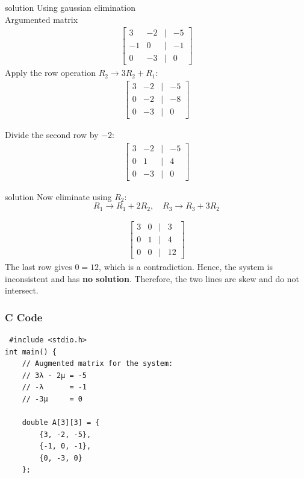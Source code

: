 \documentclass{beamer}
\begin{document}
\begin{frame}{solution}
  Using gaussian elimination\\
 Argumented matrix\\
 \begin{align}
     \begin{bmatrix}
         3 & -2 &  | & -5 \\
         -1 & 0  & | & -1\\
         0 & -3 & | & 0 
     \end{bmatrix}
 \end{align}
 Apply the row operation \( R_2 \to 3R_2 + R_1 \):
\begin{align}
\begin{bmatrix}
3 & -2 & | & -5\\
0 & -2 & | & -8\\
0 & -3 & | & 0
\end{bmatrix}
\end{align}

Divide the second row by \(-2\):
\begin{align}
\begin{bmatrix}
3 & -2 & | & -5\\
0 & 1  & | & 4\\
0 & -3 & | & 0
\end{bmatrix}
\end{align}

\end{frame}
\begin{frame}{solution}
 Now eliminate using \(R_2\):  
\[
R_1 \to R_1 + 2R_2, 
\quad R_3 \to R_3 + 3R_2
\]

\begin{align}
\begin{bmatrix}
3 & 0 & | & 3\\
0 & 1 & | & 4\\
0 & 0 & | & 12
\end{bmatrix}
\end{align}
 The last row gives \(0 = 12\), which is a contradiction.  
Hence, the system is inconsistent and has \textbf{no solution}.  
Therefore, the two lines are skew and do not intersect.
\end{frame}
\begin{frame}[fragile]
\frametitle{C Code}
\begin{lstlisting}
 #include <stdio.h>
int main() {
    // Augmented matrix for the system:
    // 3λ - 2μ = -5
    // -λ      = -1
    // -3μ     = 0
    
    double A[3][3] = {
        {3, -2, -5},
        {-1, 0, -1},
        {0, -3, 0}
    };
   
\end{lstlisting}
\end{frame}
\end{document}
